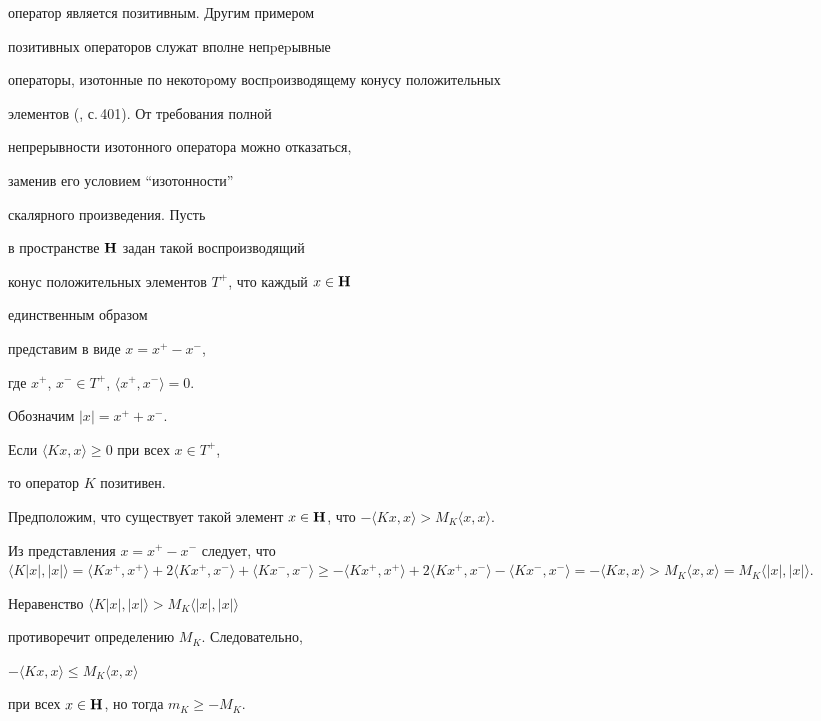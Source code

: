 оператор является позитивным. Другим примером


позитивных операторов служат вполне непpеpывные 


операторы, изотонные по некотоpому воспpоизводящему конусу положительных 


элементов (\cite{K}, с.\,401). От требования полной


непрерывности изотонного оператора можно отказаться, 


заменив его условием ``изотонности''


скалярного произведения. Пусть 


в пространстве ${\bold H}$ задан такой воспроизводящий


конус положительных элементов $T^+$, что каждый $x\in{\bold H}$


единственным образом


представим в виде $x=x^+-x^-$,


где $x^+$, $x^-\in T^+$, $\langle x^+,x^-\rangle=0$.


Обозначим $|x|=x^++x^-$.





\begin{thm}


Если $\langle Kx,x\rangle\ge0$ при всех $x\in T^+$,


то оператор $K$ позитивен.


\end{thm}





\begin{pf}


Предположим, что существует такой элемент $x\in\spc{H}$, что $-\langle


Kx,x\rangle>M_K\langle x,x\rangle$.


Из представления $x=x^{+}-x^{-}$ следует, что $\langle


K|x|,|x|\rangle=\langle Kx^{+},x^{+}\rangle+2\langle Kx^{+},x^{-}\rangle+


\langle Kx^{-},x^{-}\rangle\ge-\langle Kx^{+},x^{+}\rangle+


2\langle Kx^{+},x^{-}\rangle


-\langle Kx^{-},x^{-}\rangle=-\langle Kx,x\rangle>M_K\langle x,x\rangle


=M_K\langle |x|,|x|\rangle$.


Неравенство $\langle K|x|,|x|\rangle>M_K\langle|x|,|x|\rangle$


противоречит определению $M_K$. Следовательно,


$-\langle Kx,x\rangle\le M_K\langle x,x\rangle$


при всех $x\in{\bold H}$, но тогда $m_K\ge-M_K$.


\end{pf}





